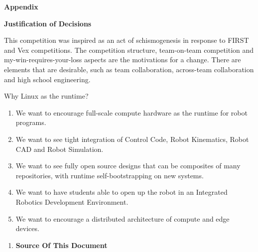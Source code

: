 \documentclass{article}
\begin{document}
\vspace{1cm}
 \pagebreak
 {\huge \textbf{Appendix}}
 
  \pagebreak
  \vspace{1cm}
 {\huge \textbf{Justification of Decisions}}
\vspace{1cm}

This competition was inspired as an act of schismogenesis in response to FIRST and Vex competitions. The competition structure, team-on-team competition and my-win-requires-your-loss aspects are the motivations for a change. There are elements that are desirable, such as team collaboration, across-team collaboration and high school engineering. 

Why Linux as the runtime? 
\begin{enumerate}
\item We want to encourage full-scale compute hardware as the runtime for robot programs. 

\item We want to see tight integration of Control Code, Robot Kinematics, Robot CAD and Robot Simulation. 

\item We want to see fully open source designs that can be composites of many repositories, with runtime self-bootstrapping on new systems. 

\item We want to have students able to open up the robot in an Integrated Robotics Development Environment. 

\item We want to encourage a distributed architecture of compute and edge devices. 
 
\end{enumerate}
\vspace{1cm}

  \pagebreak
  	\begin{enumerate}
	  \item \textbf{Source Of This Document}
	  
		

	\end{enumerate}
\end{document}

